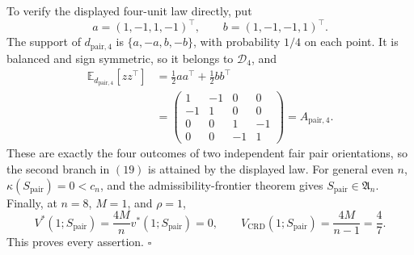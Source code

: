 To verify the displayed four-unit law directly, put
\[
a=(1,-1,1,-1)^\top,
\qquad
b=(1,-1,-1,1)^\top.
\]
The support of \(d_{\mathrm{pair},4}\) is \(\{a,-a,b,-b\}\), with probability \(1/4\) on each point. It is balanced and sign symmetric, so it belongs to \(\mathcal D_4\), and
\[
\begin{aligned}
\mathbb E_{d_{\mathrm{pair},4}}[zz^\top]
&=\frac12aa^\top+\frac12bb^\top\\
&=\begin{pmatrix}
1&-1&0&0\\
-1&1&0&0\\
0&0&1&-1\\
0&0&-1&1
\end{pmatrix}
=A_{\mathrm{pair},4}.
\end{aligned}
\tag{20}
\]
These are exactly the four outcomes of two independent fair pair orientations, so the second branch in \((19)\) is attained by the displayed law. For general even \(n\), \(\kappa(S_{\mathrm{pair}})=0<c_n\), and the admissibility-frontier theorem gives \(S_{\mathrm{pair}}\in\mathfrak A_n\). Finally, at \(n=8\), \(M=1\), and \(\rho=1\),
\[
V^*(1;S_{\mathrm{pair}})
=\frac{4M}{n}v^*(1;S_{\mathrm{pair}})=0,
\qquad
V_{\mathrm{CRD}}(1;S_{\mathrm{pair}})=\frac{4M}{n-1}=\frac47.
\tag{21}
\]
This proves every assertion. \(\square\)